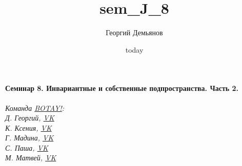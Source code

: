 \documentclass[a4paper,12pt]{article}
\title{sem_J_8}
\author{Георгий Демьянов}
\date{today}
\begin{document}
\paragraph{{\LARGE Семинар 8. Инвариантные и собственные подпространства. Часть 2.}\\}
%

%
%
%








\begin{center}
	\vfill \emph{{\small Команда \href{https://vk.com/botay_fizteh}{BOTAY!}:\\
			Д. Георгий, \href{https://vk.com/id37346992}{VK}\\
			К. Ксения, \href{https://vk.com/id143862366}{VK}\\
			Г. Мадина, \href{https://vk.com/id226312463}{VK}\\
			С. Паша, \href{https://vk.com/id181006282}{VK}\\
			М. Матвей, \href{https://vk.com/id62009425}{VK}\\
	}}
\end{center}
\end{document}
